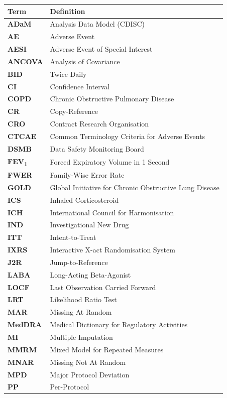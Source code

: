 \documentclass[11pt,a4paper]{article}
\begin{document}
\begin{tabularx}{\linewidth}{@{}>{\color{sapblue}\bfseries}p{22mm}>{\raggedright\arraybackslash}X@{}}
\toprule
\textbf{Term} & \textbf{Definition} \\
\midrule
ADaM   & Analysis Data Model (CDISC) \\
AE     & Adverse Event \\
AESI   & Adverse Event of Special Interest \\
ANCOVA & Analysis of Covariance \\
BID    & Twice Daily \\
CI     & Confidence Interval \\
COPD   & Chronic Obstructive Pulmonary Disease \\
CR     & Copy-Reference \\
CRO    & Contract Research Organisation \\
CTCAE  & Common Terminology Criteria for Adverse Events \\
DSMB   & Data Safety Monitoring Board \\
FEV\textsubscript{1} & Forced Expiratory Volume in 1 Second \\
FWER   & Family-Wise Error Rate \\
GOLD   & Global Initiative for Chronic Obstructive Lung Disease \\
ICS    & Inhaled Corticosteroid \\
ICH    & International Council for Harmonisation \\
IND    & Investigational New Drug \\
ITT    & Intent-to-Treat \\
IXRS   & Interactive X-act Randomisation System \\
J2R    & Jump-to-Reference \\
LABA   & Long-Acting Beta-Agonist \\
LOCF   & Last Observation Carried Forward \\
LRT    & Likelihood Ratio Test \\
MAR    & Missing At Random \\
MedDRA & Medical Dictionary for Regulatory Activities \\
MI     & Multiple Imputation \\
MMRM   & Mixed Model for Repeated Measures \\
MNAR   & Missing Not At Random \\
MPD    & Major Protocol Deviation \\
PP     & Per-Protocol \\

\end{tabularx}
\end{document}
